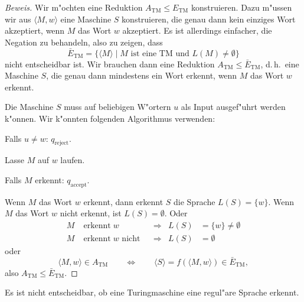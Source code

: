 \begin{proof}[Beweis]
Wir m"ochten eine Reduktion $A_{\text{TM}}\le E_{\text{TM}}$ konstruieren.
Dazu m"ussen wir aus $\langle M,w\rangle$ eine Maschine $S$ konstruieren,
die genau dann kein einziges Wort akzeptiert, wenn $M$ das Wort $w$
akzeptiert.
Es ist allerdings einfacher, die Negation zu behandeln,
also zu zeigen, dass 
\[
\bar E_{\text{TM}}=
\{ \langle M\rangle\;|\; \text{$M$ ist eine TM und $L(M)\ne\emptyset$}\}
\]
nicht entscheidbar ist.
Wir brauchen dann eine Reduktion
$A_{\text{TM}}\le \bar E_{\text{TM}}$, d.\,h.~eine Maschine $S$,
die genau dann mindestens ein Wort erkennt, wenn $M$ das Wort $w$ 
erkennt.

Die Maschine $S$ muss auf beliebigen W"ortern $u$ als Input ausgef"uhrt
werden k"onnen.
Wir k"onnten folgenden Algorithmus verwenden:
\medskip
\begin{compactenum}
\item Falls $u\ne w$: $q_{\text{reject}}$.
\item Lasse $M$ auf $w$ laufen.
\item Falls $M$ erkennt: $q_{\text{accept}}$.
\end{compactenum}
\medskip
Wenn $M$ das Wort $w$ erkennt, dann erkennt $S$ die Sprache 
$L(S)=\{w\}$.
Wenn $M$ das Wort $w$ nicht erkennt, ist $L(S)=\emptyset$.
Oder
\begin{align*}
M&\operatorname{erkennt}w              &&\Rightarrow&L(S)&=\{w\}\ne \emptyset
\\
M&\operatorname{erkennt}w\text{ nicht} &&\Rightarrow&L(S)&=\emptyset
\end{align*}
oder
\[
\langle M,w\rangle \in A_{\text{TM}}
\qquad
\Leftrightarrow
\qquad
\langle S\rangle = f(\langle M,w\rangle)\in
\bar E_{\text{TM}},
\]
also $A_{\text{TM}}\le \bar E_{\text{TM}}$.
\end{proof}

\begin{satz}
Es ist nicht entscheidbar, ob eine Turingmaschine eine regul"are
Sprache erkennt.
\end{satz}

